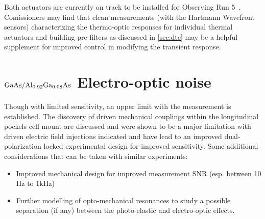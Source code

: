 Both actuators are currently on track to be installed for Observing Run 5~\cite{O5_TCS_summary}. Comissioners may find that clean measurements (with the Hartmann Wavefront sensors) characterizing the thermo-optic responses for individual thermal actuators and building pre-filters as discussed in \autoref{sec:dtc} may be a helpful supplement for improved control in modifying the transient response.

\section{\texorpdfstring{$\mathrm{GaAs} / \mathrm{Al_{0.92}Ga_{0.08}As}$}{gaas/algaas} Electro-optic noise}
Though with limited sensitivity, an upper limit with the measurement is established. The discovery of driven mechanical couplings within the longitudinal pockels cell mount are discussed and were shown to be a major limitation with driven electric field injections indicated and have lead to an improved dual-polarization locked experimental design for improved sensitivity. Some additional considerations that can be taken with similar experiments:

\begin{itemize}
	\item Improved mechanical design for improved measurement SNR (esp. between 10 Hz to 1kHz)
	\item Further modelling of opto-mechanical resonances to study a possible separation (if any) between the photo-elastic and electro-optic effects.  
\end{itemize}
